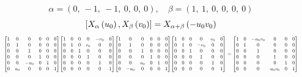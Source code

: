 \documentclass[11pt]{article}
\theoremstyle{definition}
\begin{document}
\[
\alpha = \left( 0, \  -1, \  -1, \  0, \  0, \  0\right), \quad \beta = \left( 1, \  1, \  0, \  0, \  0, \  0\right)
\]
\[
\scaletoalign{\textwidth}{\left[ X_{\alpha}\left(u_{0}\right), X_{\beta}\left(v_{0}\right) \right] = X_{\alpha + \beta}\left(- u_{0} v_{0}\right)}
\]
\[
\scaletoalign{\textwidth}{{\left[\begin{matrix}1 & 0 & 0 & 0 & 0 & 0\\0 & 1 & 0 & 0 & 0 & 0\\0 & 0 & 1 & 0 & 0 & 0\\0 & 0 & 0 & 1 & 0 & 0\\0 & 0 & - u_{0} & 0 & 1 & 0\\0 & u_{0} & 0 & 0 & 0 & 1\end{matrix}\right]} {\left[\begin{matrix}1 & 0 & 0 & 0 & - v_{0} & 0\\0 & 1 & 0 & v_{0} & 0 & 0\\0 & 0 & 1 & 0 & 0 & 0\\0 & 0 & 0 & 1 & 0 & 0\\0 & 0 & 0 & 0 & 1 & 0\\0 & 0 & 0 & 0 & 0 & 1\end{matrix}\right]} {\left[\begin{matrix}1 & 0 & 0 & 0 & 0 & 0\\0 & 1 & 0 & 0 & 0 & 0\\0 & 0 & 1 & 0 & 0 & 0\\0 & 0 & 0 & 1 & 0 & 0\\0 & 0 & u_{0} & 0 & 1 & 0\\0 & - u_{0} & 0 & 0 & 0 & 1\end{matrix}\right]} {\left[\begin{matrix}1 & 0 & 0 & 0 & v_{0} & 0\\0 & 1 & 0 & - v_{0} & 0 & 0\\0 & 0 & 1 & 0 & 0 & 0\\0 & 0 & 0 & 1 & 0 & 0\\0 & 0 & 0 & 0 & 1 & 0\\0 & 0 & 0 & 0 & 0 & 1\end{matrix}\right]} = {\left[\begin{matrix}1 & 0 & - u_{0} v_{0} & 0 & 0 & 0\\0 & 1 & 0 & 0 & 0 & 0\\0 & 0 & 1 & 0 & 0 & 0\\0 & 0 & 0 & 1 & 0 & 0\\0 & 0 & 0 & 0 & 1 & 0\\0 & 0 & 0 & u_{0} v_{0} & 0 & 1\end{matrix}\right]}}
\]
\end{document}
